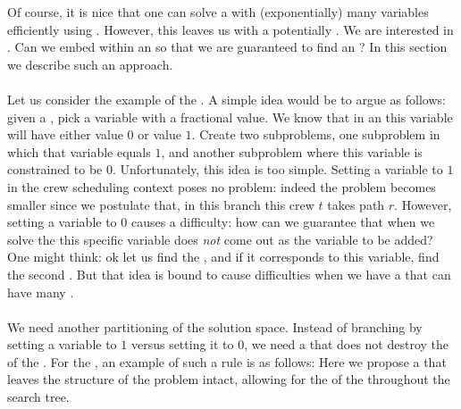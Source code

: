 Of course, it is nice that one can solve a  with (exponentially) many variables efficiently using . However, this leaves us with a potentially . We are interested in . Can we embed  within an  so that we are guaranteed to find an ? In this section we describe such an approach.

\paragraph{}
Let us consider the example of the . A simple idea would be to argue as follows: given a , pick a variable with a fractional value. We know that in an  this variable will have either value $0$ or value $1$. Create two subproblems, one subproblem in which that variable equals $1$, and another subproblem where this variable is constrained to be $0$. Unfortunately, this idea is too simple. Setting a variable to $1$ in the crew scheduling context poses no problem: indeed the problem becomes smaller since we postulate that, in this branch this crew $t$ takes path $r$. However, setting a variable to $0$ causes a difficulty: how can we guarantee that when we solve the  this specific variable does \emph{not} come out as the variable to be added? One might think: ok let us find the , and if it corresponds to this variable, find the second . But that idea is bound to cause difficulties when we have a  that can have many .

\paragraph{}
We need another partitioning of the solution space. Instead of branching by setting a variable to $1$ versus setting it to $0$, we need a  that does not destroy the  of the . For the , an example of such a rule is as follows: Here we propose a  that leaves the structure of the problem intact, allowing for the  of the  throughout the search tree.

